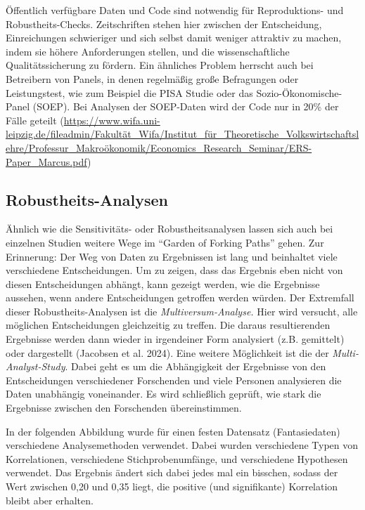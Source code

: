\documentclass[
  letterpaper,
  DIV=11,
  numbers=noendperiod]{scrreprt}
\begin{document}
Öffentlich verfügbare Daten und Code sind notwendig für Reproduktions-
und Robustheits-Checks. Zeitschriften stehen hier zwischen der
Entscheidung, Einreichungen schwieriger und sich selbst damit weniger
attraktiv zu machen, indem sie höhere Anforderungen stellen, und die
wissenschaftliche Qualitätssicherung zu fördern. Ein ähnliches Problem
herrscht auch bei Betreibern von Panels, in denen regelmäßig große
Befragungen oder Leistungstest, wie zum Beispiel die PISA Studie oder
das Sozio-Ökonomische-Panel (SOEP). Bei Analysen der SOEP-Daten wird der
Code nur in 20\% der Fälle geteilt
(\url{https://www.wifa.uni-leipzig.de/fileadmin/Fakultät_Wifa/Institut_für_Theoretische_Volkswirtschaftslehre/Professur_Makroökonomik/Economics_Research_Seminar/ERS-Paper_Marcus.pdf})

\subsection{Robustheits-Analysen}\label{robustheits-analysen}

Ähnlich wie die Sensitivitäts- oder Robustheitsanalysen lassen sich auch
bei einzelnen Studien weitere Wege im ``Garden of Forking Paths'' gehen.
Zur Erinnerung: Der Weg von Daten zu Ergebnissen ist lang und beinhaltet
viele verschiedene Entscheidungen. Um zu zeigen, dass das Ergebnis eben
nicht von diesen Entscheidungen abhängt, kann gezeigt werden, wie die
Ergebnisse aussehen, wenn andere Entscheidungen getroffen werden würden.
Der Extremfall dieser Robustheits-Analysen ist die
\emph{Multiversum-Analyse.} Hier wird versucht, alle möglichen
Entscheidungen gleichzeitig zu treffen. Die daraus resultierenden
Ergebnisse werden dann wieder in irgendeiner Form analysiert (z.B.
gemittelt) oder dargestellt (Jacobsen et al. 2024). Eine weitere
Möglichkeit ist die der \emph{Multi-Analyst-Study}. Dabei geht es um die
Abhängigkeit der Ergebnisse von den Entscheidungen verschiedener
Forschenden und viele Personen analysieren die Daten unabhängig
voneinander. Es wird schließlich geprüft, wie stark die Ergebnisse
zwischen den Forschenden übereinstimmen.

In der folgenden Abbildung wurde für einen festen Datensatz
(Fantasiedaten) verschiedene Analysemethoden verwendet. Dabei wurden
verschiedene Typen von Korrelationen, verschiedene Stichprobenumfänge,
und verschiedene Hypothesen verwendet. Das Ergebnis ändert sich dabei
jedes mal ein bisschen, sodass der Wert zwischen 0,20 und 0,35 liegt,
die positive (und signifikante) Korrelation bleibt aber erhalten.
\end{document}
